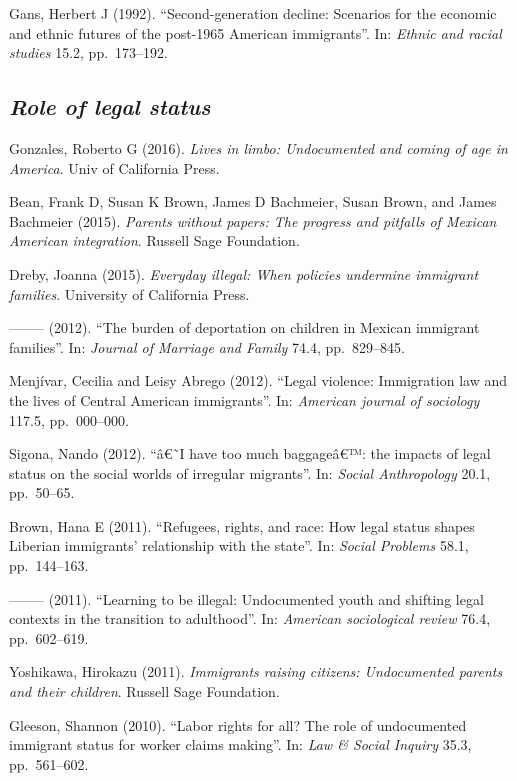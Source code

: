 \documentclass[
  12pt,
]{article}
\begin{document}
Gans, Herbert J (1992). ``Second-generation decline: Scenarios for the
economic and ethnic futures of the post-1965 American immigrants''. In:
\emph{Ethnic and racial studies} 15.2, pp.~173--192.

\hypertarget{role-of-legal-status}{%
\subsection{\texorpdfstring{\emph{Role of legal
status}}{Role of legal status}}\label{role-of-legal-status}}

Gonzales, Roberto G (2016).
\emph{Lives in limbo: Undocumented and coming of age in America}. Univ
of California Press.

Bean, Frank D, Susan K Brown, James D Bachmeier, Susan Brown, and James
Bachmeier (2015).
\emph{Parents without papers: The progress and pitfalls of Mexican American integration}.
Russell Sage Foundation.

Dreby, Joanna (2015).
\emph{Everyday illegal: When policies undermine immigrant families}.
University of California Press.

-------- (2012). ``The burden of deportation on children in Mexican
immigrant families''. In: \emph{Journal of Marriage and Family} 74.4,
pp.~829--845.

Menjívar, Cecilia and Leisy Abrego (2012). ``Legal violence: Immigration
law and the lives of Central American immigrants''. In:
\emph{American journal of sociology} 117.5, pp.~000--000.

Sigona, Nando (2012). ``â€˜I have too much baggageâ€™: the impacts of
legal status on the social worlds of irregular migrants''. In:
\emph{Social Anthropology} 20.1, pp.~50--65.

Brown, Hana E (2011). ``Refugees, rights, and race: How legal status
shapes Liberian immigrants' relationship with the state''. In:
\emph{Social Problems} 58.1, pp.~144--163.

-------- (2011). ``Learning to be illegal: Undocumented youth and
shifting legal contexts in the transition to adulthood''. In:
\emph{American sociological review} 76.4, pp.~602--619.

Yoshikawa, Hirokazu (2011).
\emph{Immigrants raising citizens: Undocumented parents and their children}.
Russell Sage Foundation.

Gleeson, Shannon (2010). ``Labor rights for all? The role of
undocumented immigrant status for worker claims making''. In:
\emph{Law \& Social Inquiry} 35.3, pp.~561--602.
\end{document}
